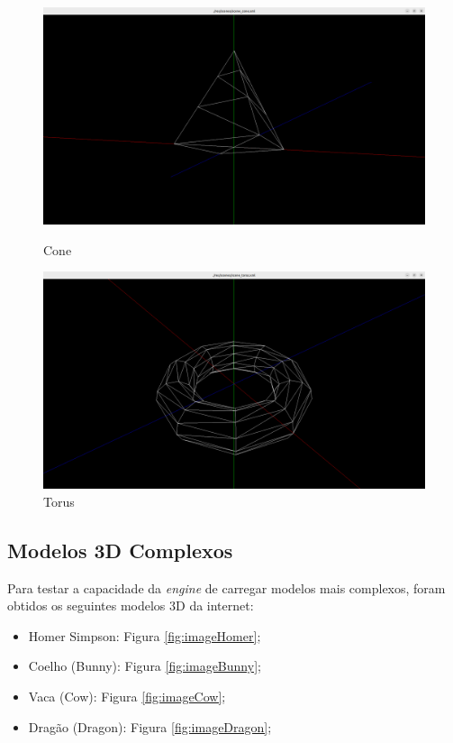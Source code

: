 \documentclass[12pt, a4paper]{article}
\begin{document}
\begin{figure}[h]
    \centering
    \begin{minipage}{0.48\textwidth}
        \centering
        \includegraphics[width=\textwidth]{res/results/Cone.png}
        \caption{Cone}
        \label{fig:imageCone}
    \end{minipage}\hfill
    \begin{minipage}{0.48\textwidth}
        \centering
        \includegraphics[width=\textwidth]{res/results/Torus.png}
        \caption{Torus}
        \label{fig:imageTorus}
    \end{minipage}
\end{figure}


\subsection{Modelos 3D Complexos}

Para testar a capacidade da \emph{engine} de carregar modelos mais complexos, foram obtidos os
seguintes modelos 3D da internet:

\begin{itemize}
    \item Homer Simpson: Figura \ref{fig:imageHomer};
    \item Coelho (Bunny): Figura \ref{fig:imageBunny};
    \item Vaca (Cow): Figura \ref{fig:imageCow};
    \item Dragão (Dragon): Figura \ref{fig:imageDragon};
\end{itemize}
\end{document}
